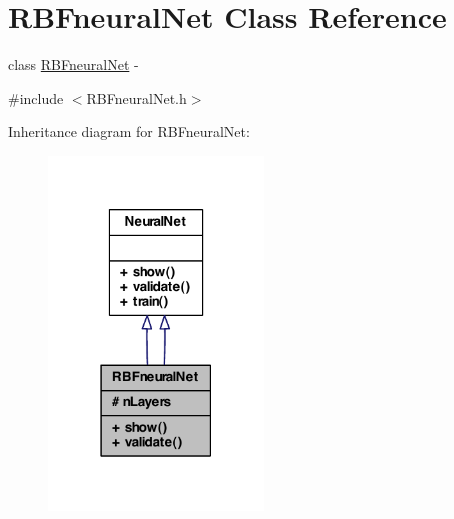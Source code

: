 \hypertarget{class_r_b_fneural_net}{
\section{RBFneuralNet Class Reference}
\label{class_r_b_fneural_net}
}


class \hyperlink{class_r_b_fneural_net}{RBFneuralNet} -\/  




{\ttfamily \#include $<$RBFneuralNet.h$>$}



Inheritance diagram for RBFneuralNet:\nopagebreak
\begin{figure}[H]
\begin{center}
\leavevmode
\includegraphics[width=162pt]{class_r_b_fneural_net__inherit__graph}
\end{center}
\end{figure}


